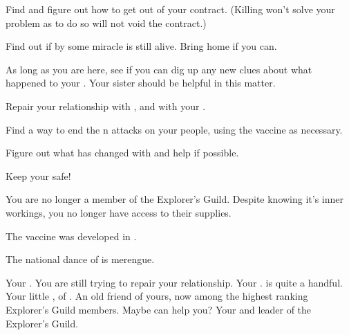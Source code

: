 \documentclass[char]{NeptuneBall}
\begin{document}
\begin{itemz}[Goals]
  \item Find \cWitch{} and figure out how to get out of your contract. (Killing \cWitch{} won't solve your problem as to do so will not void the contract.)
  \item Find out if by some miracle \cSlave{} is still alive. Bring \cSlave{\them} home if you can.
  \item As long as you are here, see if you can dig up any new  clues about what happened to your \cAthena{\parent}. Your sister should be helpful in this matter.
  \item Repair your relationship with \cKing{\King} \cKing{}, and with your \cPrincess{\sibling} \cPrincess{}.
	\item Find a way to end the \pPacifica{}n attacks on your people, using the \cPolio{} vaccine as necessary.
  \item Figure out what has changed with \cPriest{} and help \cPriest{\them} if possible.
  \item Keep your \cWillow{\offspring} safe!
\end{itemz}

\begin{itemz}[Notes]
  \item You are no longer a member of the Explorer's Guild. Despite knowing it's inner workings, you no longer have access to their supplies.
\end{itemz}

\begin{itemz}[Trivia]
  \item The \ppolio{} vaccine was developed in \pCity{}.
  \item The national dance of \pAtlantis{} is merengue.
\end{itemz}

\begin{contacts}
  \contact{\cKing{}} Your \cKing{\parent}. You are still trying to repair your relationship.
  \contact{\cWillow{}} Your \cWillow{\offspring}. \cWillow{\They} is quite a handful.
  \contact{\cPrincess{}} Your little \cPrincess{\sibling}, \cPrincess{\prince} of \pAtlantis{}.
  \contact{\cPriest{}} An old friend of yours, now among the highest ranking Explorer's Guild members. Maybe \cPriest{\they} can help you?
  \contact{\cPlant{}} Your \cPlant{\uncle} and leader of the Explorer's Guild.
\end{contacts}
\end{document}
